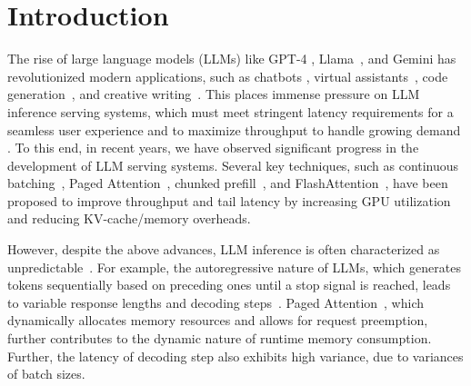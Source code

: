 \documentclass[sigconf, review, anonymous]{acmart}
\begin{document}
\maketitle

\section{Introduction} \label{section:introduction}

The rise of large language models (LLMs) like GPT-4 \cite{chatgpt}, Llama~\cite{llama}, and Gemini \cite{Gemini} has revolutionized modern applications, such as chatbots \cite{chatgpt}, virtual assistants~\cite{guan2023intelligentvirtualassistantsllmbased}, code generation~\cite{jiang2024surveylargelanguagemodels}, and creative writing~\cite{gómezrodríguez2023confederacymodelscomprehensiveevaluation}. This places immense pressure on LLM inference serving systems, which must meet stringent latency requirements for a seamless user experience and to maximize throughput to handle growing demand \cite{shen2025accelgenheterogeneoussloguaranteedhighthroughput, cheng2025scootsloorientedperformancetuning, vllm, orca}. To this end, in recent years, we have observed significant progress in the development of LLM serving systems. Several key techniques, such as continuous batching~\cite{orca}, Paged Attention~\cite{vllm}, chunked prefill~\cite{agrawal2023sarathiefficientllminference}, and FlashAttention~\cite{flashattentionv2}, have been proposed to improve throughput and tail latency by increasing GPU utilization and reducing KV-cache/memory overheads.

However, despite the above advances, LLM inference is often characterized as unpredictable~\cite{sun2024llumnix}. For example, the autoregressive nature of LLMs, which generates tokens sequentially based on preceding ones until a stop signal is reached, leads to variable response lengths and decoding steps~\cite{schuurmans2024autoregressivelargelanguagemodels}.
Paged Attention~\cite{vllm}, which dynamically allocates memory resources and allows for request preemption, further contributes to the dynamic nature of runtime memory consumption. Further, the latency of decoding step also exhibits high variance, due to variances of batch sizes.
\end{document}
